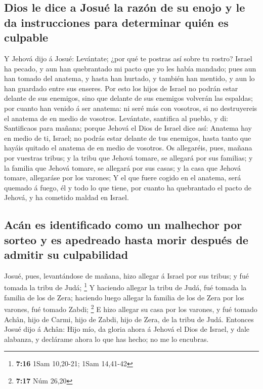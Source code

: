 \hypertarget{dios-le-dice-a-josuuxe9-la-razuxf3n-de-su-enojo-y-le-da-instrucciones-para-determinar-quiuxe9n-es-culpable}{%
\subsection{Dios le dice a Josué la razón de su enojo y le da
instrucciones para determinar quién es
culpable}\label{dios-le-dice-a-josuuxe9-la-razuxf3n-de-su-enojo-y-le-da-instrucciones-para-determinar-quiuxe9n-es-culpable}}

 Y Jehová dijo á Josué: Levántate; ¿por qué te postras
así sobre tu rostro?  Israel ha pecado, y aun han
quebrantado mi pacto que yo les había mandado; pues aun han tomado del
anatema, y hasta han hurtado, y también han mentido, y aun lo han
guardado entre sus enseres.  Por esto los hijos de Israel
no podrán estar delante de sus enemigos, sino que delante de sus
enemigos volverán las espaldas; por cuanto han venido á ser anatema: ni
seré más con vosotros, si no destruyereis el anatema de en medio de
vosotros.  Levántate, santifica al pueblo, y di:
Santificaos para mañana; porque Jehová el Dios de Israel dice así:
Anatema hay en medio de ti, Israel; no podrás estar delante de tus
enemigos, hasta tanto que hayáis quitado el anatema de en medio de
vosotros.  Os allegaréis, pues, mañana por vuestras
tribus; y la tribu que Jehová tomare, se allegará por sus familias; y la
familia que Jehová tomare, se allegará por sus casas; y la casa que
Jehová tomare, allegaráse por los varones;  Y el que
fuere cogido en el anatema, será quemado á fuego, él y todo lo que
tiene, por cuanto ha quebrantado el pacto de Jehová, y ha cometido
maldad en Israel.

\hypertarget{acuxe1n-es-identificado-como-un-malhechor-por-sorteo-y-es-apedreado-hasta-morir-despuuxe9s-de-admitir-su-culpabilidad}{%
\subsection{Acán es identificado como un malhechor por sorteo y es
apedreado hasta morir después de admitir su
culpabilidad}\label{acuxe1n-es-identificado-como-un-malhechor-por-sorteo-y-es-apedreado-hasta-morir-despuuxe9s-de-admitir-su-culpabilidad}}

 Josué, pues, levantándose de mañana, hizo allegar á
Israel por sus tribus; y fué tomada la tribu de Judá; \footnote{\textbf{7:16}
  1Sam 10,20-21; 1Sam 14,41-42}  Y haciendo allegar la
tribu de Judá, fué tomada la familia de los de Zera; haciendo luego
allegar la familia de los de Zera por los varones, fué tomado Zabdi;
\footnote{\textbf{7:17} Núm 26,20}  E hizo allegar su
casa por los varones, y fué tomado Achân, hijo de Carmi, hijo de Zabdi,
hijo de Zera, de la tribu de Judá.  Entonces Josué dijo á
Achân: Hijo mío, da gloria ahora á Jehová el Dios de Israel, y dale
alabanza, y declárame ahora lo que has hecho; no me lo encubras.

